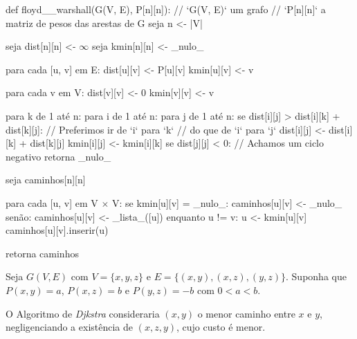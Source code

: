 \documentclass{homework}
\begin{document}
	\begin{algor}
	def floyd__warshall(G(V, E), P[n][n]):
		// `G(V, E)` um grafo
		// `P[n][n]` a matriz de pesos das arestas de G
		seja n <- |V|
		
		seja dist[n][n] <- $\infty$
		seja kmin[n][n] <- _nulo_
		
		para cada [u, v] em E:
			dist[u][v] <- P[u][v] 
			kmin[u][v] <- v
			
		para cada v em V:
			dist[v][v] <- 0
			kmin[v][v] <- v
			
		para k de 1 até n:
			para i de 1 até n:
				para j de 1 até n:
					se dist[i][j] > dist[i][k] + dist[k][j]:
						// Preferimos ir de `i` para `k`
						// do que de `i` para `j`
						dist[i][j] <- dist[i][k] + dist[k][j]
						kmin[i][j] <- kmin[i][k]
					se dist[j][j] < 0:
						// Achamos um ciclo negativo
						retorna _nulo_
						
		seja caminhos[n][n]
		
		para cada [u, v] em V $\times$ V:
			se kmin[u][v] = _nulo_:
				caminhos[u][v] <- _nulo_
			senão:
				caminhos[u][v] <- _lista_([u])
				enquanto u != v:
					u <- kmin[u][v]
					caminhos[u][v].inserir(u)
		
		retorna caminhos
	\end{algor}
	
	\quest %
	
	
	Seja $G(V, E)$ com $V = \{x, y, z\}$ e $E = \{(x, y), (x, z), (y, z)\}$. Suponha que $P(x, y) = a$, $P(x, z) = b$ e $P(y, z) = -b$ com $0 < a < b$.
	\begin{fig}
		
	\end{fig}
	O Algoritmo de \textit{Djkstra} consideraria $(x, y)$ o menor caminho entre $x$ e $y$, negligenciando a existência de $(x, z, y)$, cujo custo é menor. 
	
	
\end{document}
